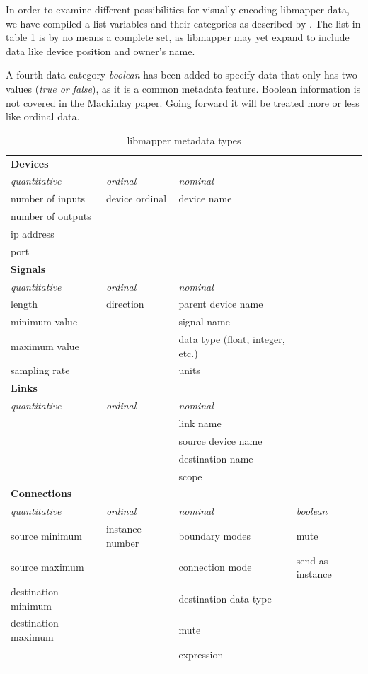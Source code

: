 In order to examine different possibilities for visually encoding libmapper data, we have compiled a list variables and their categories as described by . The list in table \ref{tab:metadata_types} is by no means a complete set, as libmapper may yet expand to include data like device position and owner's name.

A fourth data category \emph{boolean} has been added to specify data that only has two values (\emph{true or false}), as it is a common metadata feature. Boolean information is not covered in the Mackinlay paper. Going forward it will be treated more or less like ordinal data.

\newpage

\begin{longtable}{l l p{4cm} l}
\caption[libmapper metadata types]{libmapper metadata types} \label{tab:metadata_types} \\

	\hline\hline
	\textbf{Devices} & & \\
	\emph{quantitative} & \emph{ordinal} & \emph{nominal}\\
	\hline
	number of inputs & device ordinal & device name\\
		number of outputs \\
	ip address \\
	port \\ [0.7cm]

	\hline\hline
	\textbf{Signals} & & \\
	\emph{quantitative} & \emph{ordinal} & \emph{nominal}\\
	\hline
	length & direction & parent device name\\
	minimum value & & signal name \\
	maximum value & & data type (float, integer, etc.)\\
	sampling rate & & units \\ [0.7cm]

	\hline\hline
	\textbf{Links} & & \\
	\emph{quantitative} & \emph{ordinal} & \emph{nominal}\\
	\hline
	& & link name \\
	& & source device name \\
	& & destination name \\
	& & scope \\ [0.7cm]

	\hline\hline
	\textbf{Connections} & & \\
	\emph{quantitative} & \emph{ordinal} & \emph{nominal} & \emph{boolean}\\
	\hline
	source minimum & instance number & boundary modes & mute\\
	source maximum & & connection mode & send as instance\\
	destination minimum & & destination data type \\
	destination maximum & & mute \\
	& & expression \\
	& & \\
\end{longtable}


